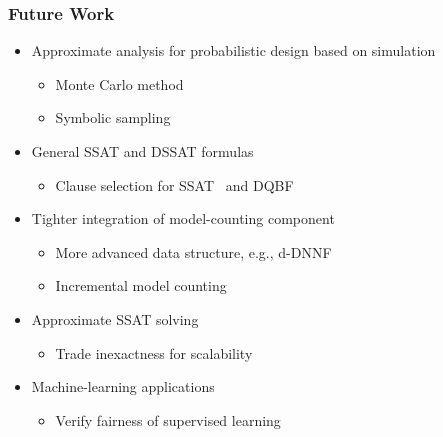 \begin{frame}
      \frametitle{Future Work}
      \begin{itemize}
            \item Approximate analysis for probabilistic design based on simulation
                  \begin{itemize}
                        \item Monte Carlo method
                        \item Symbolic sampling~\cite{KravetsDAC19ECOSampling}
                  \end{itemize}
                  \pause
            \item General SSAT and DSSAT formulas
                  \begin{itemize}
                        \item Clause selection for SSAT~\cite{Chen2021} and DQBF~\cite{Tentrup2019}
                  \end{itemize}
                  \pause
            \item Tighter integration of model-counting component
                  \begin{itemize}
                        \item More advanced data structure, e.g., d-DNNF~\cite{Darwiche2002dDNNF}
                        \item Incremental model counting
                  \end{itemize}
                  \pause
            \item Approximate SSAT solving
                  \begin{itemize}
                        \item Trade inexactness for scalability
                  \end{itemize}
                  \pause
            \item Machine-learning applications
                  \begin{itemize}
                        \item Verify fairness of supervised learning~\cite{Ghosh2021}
                  \end{itemize}
      \end{itemize}
\end{frame}